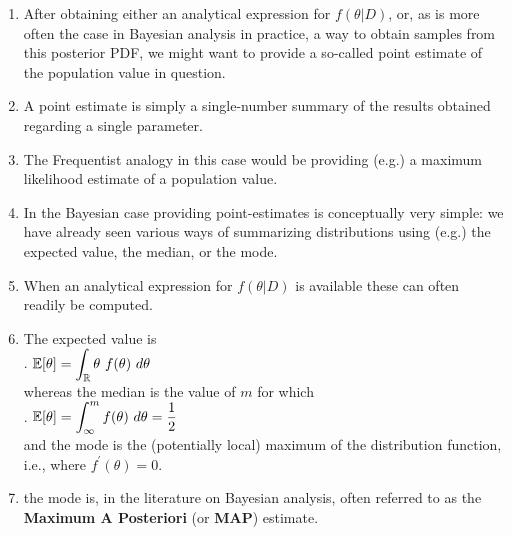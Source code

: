 \begin{enumerate}
    \item After obtaining either an analytical expression for $f (\theta|D)$, or, as is more often the case in Bayesian analysis in practice, a way to obtain samples from this posterior PDF, we might want to provide a so-called point estimate of the population value in question.
    \hfill \cite{statistics/book/Statistics-for-Data-Scientists/Maurits-Kaptein}

    \item A point estimate is simply a single-number summary of the results obtained regarding a single parameter. 
    \hfill \cite{statistics/book/Statistics-for-Data-Scientists/Maurits-Kaptein}

    \item  The Frequentist analogy in this case would be providing (e.g.) a maximum likelihood estimate of a population value.
    \hfill \cite{statistics/book/Statistics-for-Data-Scientists/Maurits-Kaptein}

    \item In the Bayesian case providing point-estimates is conceptually very simple: we have already seen various ways of summarizing distributions using (e.g.) the expected value, the median, or the mode.
    \hfill \cite{statistics/book/Statistics-for-Data-Scientists/Maurits-Kaptein}

    \item When an analytical expression for $f (\theta|D)$ is available these can often readily be computed.
    \hfill \cite{statistics/book/Statistics-for-Data-Scientists/Maurits-Kaptein}

    \item The expected value is 
    \hfill \cite{statistics/book/Statistics-for-Data-Scientists/Maurits-Kaptein}
    \\[0.2cm]
    .\hfill
    $\mbbE[\theta] = \dint_{\mbbR} \theta\ f(\theta)\ d\theta$
    \hfill \cite{statistics/book/Statistics-for-Data-Scientists/Maurits-Kaptein}
    \\[0.2cm]
    whereas the median is the value of $m$ for which 
    \hfill \cite{statistics/book/Statistics-for-Data-Scientists/Maurits-Kaptein}
    \\[0.2cm]
    .\hfill
    $\mbbE[\theta] = \dint^m_{\infty} f(\theta)\ d\theta = \dfrac{1}{2}$
    \hfill \cite{statistics/book/Statistics-for-Data-Scientists/Maurits-Kaptein}
    \\[0.2cm]
    and the mode is the (potentially local) maximum of the distribution function, i.e., where $f^\prime(\theta) = 0$.
    \hfill \cite{statistics/book/Statistics-for-Data-Scientists/Maurits-Kaptein}

    \item the mode is, in the literature on Bayesian analysis, often referred to as the \textbf{Maximum A Posteriori} (or \textbf{MAP}) estimate.
    \hfill \cite{statistics/book/Statistics-for-Data-Scientists/Maurits-Kaptein}

    
\end{enumerate}





